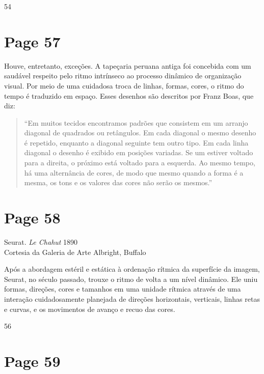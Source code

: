 \documentclass[a4paper]{article}
\begin{document}
54

\newpage
\section*{Page 57}

Houve, entretanto, exceções. A tapeçaria peruana antiga foi concebida com um saudável respeito pelo ritmo intrínseco ao processo dinâmico de organização visual. Por meio de uma cuidadosa troca de linhas, formas, cores, o ritmo do tempo é traduzido em espaço. Esses desenhos são descritos por Franz Boas, que diz:

\begin{quote}
``Em muitos tecidos encontramos padrões que consistem em um arranjo diagonal de quadrados ou retângulos. Em cada diagonal o mesmo desenho é repetido, enquanto a diagonal seguinte tem outro tipo. Em cada linha diagonal o desenho é exibido em posições variadas. Se um estiver voltado para a direita, o próximo está voltado para a esquerda. Ao mesmo tempo, há uma alternância de cores, de modo que mesmo quando a forma é a mesma, os tons e os valores das cores não serão os mesmos.''
\end{quote}

\vspace*{\fill}

\newpage
\section*{Page 58}

\begin{center}
Seurat. \textit{Le Chahut} 1890 \\
Cortesia da Galeria de Arte Albright, Buffalo
\end{center}

Após a abordagem estéril e estática à ordenação rítmica da superfície da imagem, Seurat, no século passado, trouxe o ritmo de volta a um nível dinâmico. Ele uniu formas, direções, cores e tamanhos em uma unidade rítmica através de uma interação cuidadosamente planejada de direções horizontais, verticais, linhas retas e curvas, e os movimentos de avanço e recuo das cores.

\vspace{\fill}
\raggedright
56

\newpage
\section*{Page 59}
\end{document}

